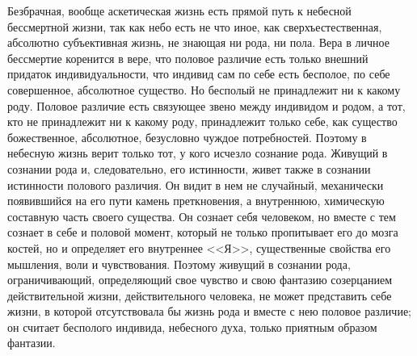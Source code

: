 \documentclass[12pt,oneside]{book}
\begin{document}
Безбрачная, вообще аскетическая жизнь есть прямой путь к небесной бессмертной жизни, так как небо есть не что иное, как сверхъестественная, абсолютно субъективная жизнь, не знающая ни рода, ни пола. Вера в личное бессмертие коренится в вере, что половое различие есть только внешний придаток индивидуальности, что индивид сам по себе есть бесполое, по себе совершенное, абсолютное существо. Но бесполый не принадлежит ни к какому роду. Половое различие есть связующее звено между индивидом и родом, а тот, кто не принадлежит ни к какому роду, принадлежит только себе, как существо божественное, абсолютное, безусловно чуждое потребностей. Поэтому в небесную жизнь верит только тот, у кого исчезло сознание рода. Живущий в сознании рода и, следовательно, его истинности, живет также в сознании истинности полового различия. Он видит в нем не случайный, механически появившийся на его пути камень преткновения, а внутреннюю, химическую составную часть своего существа. Он сознает себя человеком, но вместе с тем сознает в себе и половой момент, который не только пропитывает его до мозга костей, но и определяет его внутреннее <<Я>>, существенные свойства его мышления, воли и чувствования. Поэтому живущий в сознании рода, ограничивающий, определяющий свое чувство и свою фантазию созерцанием действительной жизни, действительного человека, не может представить себе жизни, в которой отсутствовала бы жизнь рода и вместе с нею половое различие; он считает бесполого индивида, небесного духа, только приятным образом фантазии.
\end{document}
